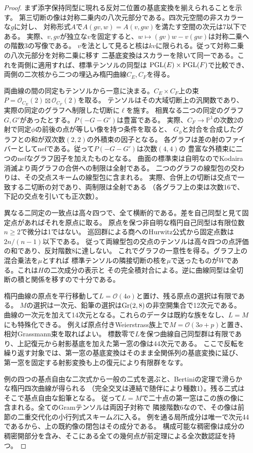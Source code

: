 \begin{proof}
まず添字保持同型に現れる反対二位置の基底変換を揃えられることを示す。
第三切断の像は対称二乗内の八次元部分である。四次元空間の非スカラーな$g$に対し、
対称形式$A$で$A(gv,w)=A(v,gw)$を満たす空間の次元は7以下である。
実際、$v,gv$が独立な$v$を固定すると、$w\mapsto (gv)w-v(gw)$は対称二乗への階数3の写像である。
$v$を法として見ると核は$kv$に限られる。従って対称二乗の八次元部分を対称二乗に移す
二基底変換はスカラーを除いて同一である。これを両側に適用すれば、標準テンソルの同型は
$\operatorname{PGL}(E)\times\operatorname{PGL}(F)$で比較でき、両側の二次核から二つの埋込み楕円曲線$C_E,C_F$を得る。

両曲線の間の同定もテンソルから一意に決まる。$C_E\times C_F$上の束
$P=\mathcal O_{C_E}(2)\boxtimes\mathcal O_{C_F}(2)$を取る。
テンソルはその大域切断上の汎関数であり、実際の同定のグラフへ制限した切断に$\ell$を施す。
相異なる二つの同定のグラフ$G,G'$があったとする。$P(-G-G')$は豊富である。
実際、$C_F\to\mathbb P^1$の次数2の射で同定$\phi$の前後の点が等しい像を持つ条件を取ると、
$G_\phi$と対合を合成したグラフとの和が双次数$(2,2)$の外積束の因子となる。
各グラフは差の射のファイバーとしてnefである。従って$P(-G-G')$は次数$(4,4)$の
豊富な外積束に二つのnefなグラフ因子を加えたものとなる。
曲面の標準束は自明なのでKodaira消滅より両グラフの合併への制限は全射である。
二つのグラフの線型包の交わりは、その交点スキームの線型包に含まれる。
実際、合併上の切断は交点で一致する二切断の対であり、両制限は全射である
（各グラフ上の束は次数16で、下記の交点を引いても正次数）。

異なる二同定の一致点は高々四つで、全て横断的である。差を自己同型と見て固定点があればそれを原点に取る。
原点を保つ非自明な楕円自己同型は有限位数$n\ge2$で微分は1ではない。
巡回群による商へのHurwitz公式から固定点数は$2n/(n-1)$以下である。
従って両線型包の交点のテンソルは高々四つの点評価の和であり、反対階数8に達しない。
これでグラフの一意性を得る。グラフ上の混合乗法を$\mu$とすれば
標準テンソルの隣接切断の核を$\mu$で送ったものが$W$である。これは$H$の二次成分の表示と
その完全積対合による。逆に曲線同型は全切断の積と関係を移すので十分である。

楕円曲線の原点を平行移動して$L=\mathcal O(4o)$と置け、残る原点の選択は有限である。
$M$の選択は一次元、鉛筆の選択は$\operatorname{Gr}(2,8)$の非空開集合で12次元である。
曲線の一次元を加えて14次元となる。これらのデータは既約な族をなし、$L=M$にも特殊化できる。
例えば原点付きWeierstrass族上で$M=\mathcal O(3o+p)$と置き、相対Grassmann束を取ればよい。
標数零で$L$を保つ曲線自己同型群は有限であり、上記復元から射影基底を加えた第一窓の像は44次元である。
ここで反転を繰り返す対象では、第一窓の基底変換はそのまま全関係列の基底変換に延び、
第一窓を固定する射影変換も上の復元により有限群をなす。

例の四つの基点自由な二次式から一般の二式を選ぶと、Bertiniの定理で滑らかな楕円四次曲線が得られる
（完全交叉は連結で随伴により種数1）。残る二式はそこで基点自由な鉛筆となる。
従って$L=M$で二十点の第一窓はこの族の像に含まれる。全てのGramテンソルは両因子対称で
隣接階数6なので、その像は前節の二重交代化の小行列式スキーム$Z$に入る。
例を通る局所成分は唯一で次元44であるから、上の既約像の閉包はその成分である。
構成可能な稠密像は成分の稠密開部分を含み、そこにある全ての幾何点が前定理による全次数認証を持つ。
\end{proof}

